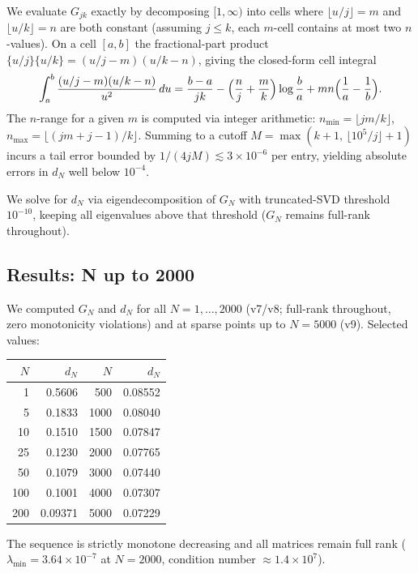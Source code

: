 \documentclass[11pt]{article}
\begin{document}
We evaluate $G_{jk}$ exactly by decomposing $[1,\infty)$ into cells where
$\lfloor u/j \rfloor = m$ and $\lfloor u/k \rfloor = n$ are both constant (assuming $j \le k$,
each $m$-cell contains at most two $n$-values). On a cell $[a,b]$ the fractional-part
product $\{u/j\}\{u/k\} = (u/j - m)(u/k - n)$, giving the closed-form cell integral
\[
  \int_a^b \frac{(u/j-m)(u/k-n)}{u^2}\,du
  = \frac{b-a}{jk} - \Bigl(\frac{n}{j}+\frac{m}{k}\Bigr)\log\frac{b}{a}
    + mn\Bigl(\frac{1}{a}-\frac{1}{b}\Bigr).
\]
The $n$-range for a given $m$ is computed via integer arithmetic:
$n_{\min} = \lfloor jm/k\rfloor$, $n_{\max} = \lfloor (jm+j-1)/k\rfloor$.
Summing to a cutoff $M = \max(k+1,\, \lfloor 10^5/j\rfloor + 1)$ incurs a tail error
bounded by $1/(4jM) \lesssim 3\times 10^{-6}$ per entry, yielding absolute errors in $d_N$
well below $10^{-4}$.

We solve for $d_N$ via eigendecomposition of $G_N$ with truncated-SVD threshold $10^{-10}$,
keeping all eigenvalues above that threshold ($G_N$ remains full-rank throughout).

\subsection{Results: N up to 2000}

We computed $G_N$ and $d_N$ for all $N = 1, \ldots, 2000$ (v7/v8; full-rank throughout,
zero monotonicity violations) and at sparse points up to $N = 5000$ (v9). Selected values:

\begin{center}
\begin{tabular}{r@{\quad}r r@{\quad}r}
\toprule
$N$ & $d_N$ & $N$ & $d_N$ \\
\midrule
1   & 0.5606  & 500  & 0.08552 \\
5   & 0.1833  & 1000 & 0.08040 \\
10  & 0.1510  & 1500 & 0.07847 \\
25  & 0.1230  & 2000 & 0.07765 \\
50  & 0.1079  & 3000 & 0.07440 \\
100 & 0.1001  & 4000 & 0.07307 \\
200 & 0.09371 & 5000 & 0.07229 \\
\bottomrule
\end{tabular}
\end{center}

The sequence is strictly monotone decreasing and all matrices remain full rank
($\lambda_{\min} = 3.64\times10^{-7}$ at $N=2000$, condition number $\approx 1.4\times10^7$).
\end{document}

